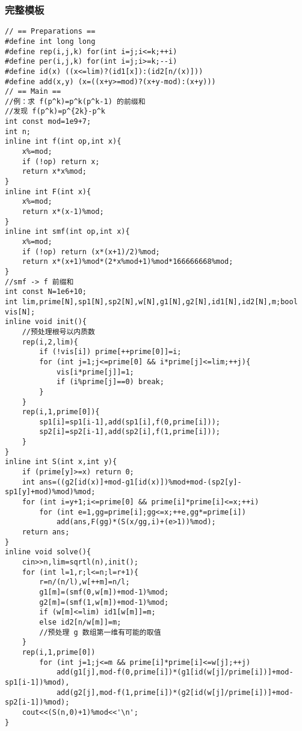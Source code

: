 \subsubsection{完整模板}

\begin{verbatim}
// == Preparations ==
#define int long long
#define rep(i,j,k) for(int i=j;i<=k;++i)
#define per(i,j,k) for(int i=j;i>=k;--i)
#define id(x) ((x<=lim)?(id1[x]):(id2[n/(x)]))
#define add(x,y) (x=((x+y>=mod)?(x+y-mod):(x+y)))
// == Main ==
//例：求 f(p^k)=p^k(p^k-1) 的前缀和
//发现 f(p^k)=p^{2k}-p^k
int const mod=1e9+7;
int n;
inline int f(int op,int x){
    x%=mod;
    if (!op) return x;
    return x*x%mod;
}
inline int F(int x){
    x%=mod;
    return x*(x-1)%mod;
}
inline int smf(int op,int x){
    x%=mod;
    if (!op) return (x*(x+1)/2)%mod;
    return x*(x+1)%mod*(2*x%mod+1)%mod*166666668%mod;
}
//smf -> f 前缀和
int const N=1e6+10;
int lim,prime[N],sp1[N],sp2[N],w[N],g1[N],g2[N],id1[N],id2[N],m;bool vis[N];
inline void init(){
    //预处理根号以内质数
    rep(i,2,lim){
        if (!vis[i]) prime[++prime[0]]=i;
        for (int j=1;j<=prime[0] && i*prime[j]<=lim;++j){
            vis[i*prime[j]]=1;
            if (i%prime[j]==0) break;
        }
    }
    rep(i,1,prime[0]){
        sp1[i]=sp1[i-1],add(sp1[i],f(0,prime[i]));
        sp2[i]=sp2[i-1],add(sp2[i],f(1,prime[i]));
    }
}
inline int S(int x,int y){
    if (prime[y]>=x) return 0;
    int ans=((g2[id(x)]+mod-g1[id(x)])%mod+mod-(sp2[y]-sp1[y]+mod)%mod)%mod;
    for (int i=y+1;i<=prime[0] && prime[i]*prime[i]<=x;++i)
        for (int e=1,gg=prime[i];gg<=x;++e,gg*=prime[i])
            add(ans,F(gg)*(S(x/gg,i)+(e>1))%mod);
    return ans;
}
inline void solve(){
    cin>>n,lim=sqrtl(n),init();
    for (int l=1,r;l<=n;l=r+1){
        r=n/(n/l),w[++m]=n/l;
        g1[m]=(smf(0,w[m])+mod-1)%mod;
        g2[m]=(smf(1,w[m])+mod-1)%mod;
        if (w[m]<=lim) id1[w[m]]=m;
        else id2[n/w[m]]=m;
        //预处理 g 数组第一维有可能的取值
    }
    rep(i,1,prime[0])
        for (int j=1;j<=m && prime[i]*prime[i]<=w[j];++j)
            add(g1[j],mod-f(0,prime[i])*(g1[id(w[j]/prime[i])]+mod-sp1[i-1])%mod),
            add(g2[j],mod-f(1,prime[i])*(g2[id(w[j]/prime[i])]+mod-sp2[i-1])%mod);
    cout<<(S(n,0)+1)%mod<<'\n';
}
\end{verbatim}
